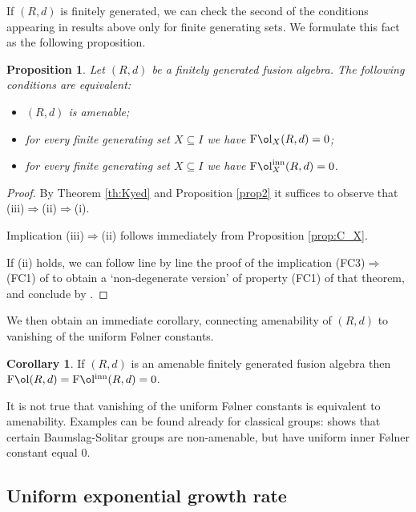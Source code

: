 \documentclass[11 pt, leqno]{amsart}
\DeclareMathOperator{\Fol}{F\mathrm{\o}l}
\DeclareMathOperator{\Folinn}{F\mathrm{\o}l^{inn}}
\newcommand{\FolinnX}{\operatorname{F\mathrm{\o}l}_{X}^{\operatorname{inn}}}
\newtheorem{proposition}[theorem]{Proposition}
\theoremstyle{definition}
\newtheorem{corollary}[theorem]{Corollary}
\numberwithin{equation}{section}
\begin{document}
If $(R,d)$ is finitely generated, we can check the second of the conditions appearing in results above only for finite generating sets. We formulate this fact as the following proposition.

\begin{proposition}\label{prop10}
Let $(R,d)$ be a finitely generated fusion algebra. The following conditions are equivalent:
\begin{itemize}
	\item[(i)] $(R,d)$ is amenable;
	\item[(ii)] for every  finite generating set $ X\subseteq I$ we have $\Fol_X(R,d)=0$;
	\item[(iii)] for every  finite generating set $ X\subseteq I$ we have $\FolinnX(R,d)=0$.
\end{itemize}
\end{proposition}
\begin{proof}
By Theorem \ref{th:Kyed} and Proposition \ref{prop2} it suffices to observe that (iii)$\Longrightarrow$(ii)$\Longrightarrow$(i).

Implication (iii)$\Longrightarrow$(ii) follows immediately from Proposition \ref{prop:C_X}.

If (ii) holds, we can follow line by line the proof of the implication (FC3)$\Longrightarrow$(FC1) of \cite[Theorem 3.3] {Kyed} to obtain a `non-degenerate version' of property (FC1) of that theorem, and conclude by \cite[Theorem 4.6]{HiaiIzumi}.
	
\end{proof}

We then obtain an immediate corollary, connecting amenability of $(R,d)$ to vanishing of the uniform F\o lner constants.

\begin{corollary}\label{prop3}
	If $(R,d)$ is an amenable finitely generated fusion algebra then $\Fol(R,d)= \Folinn (R,d)=0$.
\end{corollary}

It is not true that vanishing of the uniform F\o lner constants is equivalent to amenability. Examples can be found already for classical groups: \cite[Proposition 13.3]{Arzhantseva} shows that certain Baumslag-Solitar groups are non-amenable, but have uniform inner F\o lner constant equal $0$. 



\subsection{Uniform exponential growth rate}
\end{document}
